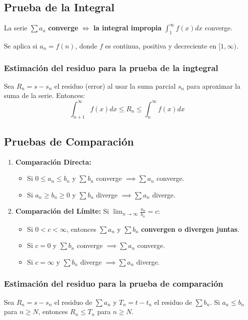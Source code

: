 \documentclass[a4paper,12pt]{article}
\begin{document}
\subsection{Prueba de la Integral}
\begin{tcolorbox}
    La serie $\sum a_n$ \textbf{ converge } $\Leftrightarrow$ \textbf{ la integral impropia } $\int_{1}^{\infty} f(x) dx$ converge.
\end{tcolorbox}
Se aplica si $a_n = f(n)$, donde $f$ es continua, positiva y decreciente en $[1, \infty)$.

\subsubsection{Estimación del residuo para la prueba de la ingtegral}
Sea $R_n = s - s_n$ el residuo (error) al usar la suma parcial $s_n$ para aproximar la suma de la serie. Entonces:
$$ \int_{n+1}^{\infty} f(x) dx \leqslant R_n \leqslant \int_{n}^{\infty} f(x) dx $$

\subsection{Pruebas de Comparación}
\begin{enumerate}
    \item \textbf{Comparación Directa:} 
        \begin{itemize}
            \item Si $0 \leqslant a_n \leqslant b_n$ y $\sum b_n$ converge $\implies \sum a_n$ converge.
            \item Si $a_n \geqslant b_n \geqslant 0$ y $\sum b_n$ diverge $\implies \sum a_n$ diverge.
        \end{itemize}
    \item \textbf{Comparación del Límite:} Si $\lim_{n \to \infty} \frac{a_n}{b_n} = c$:
        \begin{itemize}
            \item Si $0 < c < \infty$, entonces $\sum a_n$ y $\sum b_n$ \textbf{convergen o divergen juntas}.
            \item Si $c = 0$ y $\sum b_n$ converge $\implies \sum a_n$ converge.
            \item Si $c = \infty$ y $\sum b_n$ diverge $\implies \sum a_n$ diverge.
        \end{itemize}
\end{enumerate}

\subsubsection{Estimación del residuo para la prueba de comparación}
Sea $R_n = s - s_n$ el residuo de $\sum a_n$ y $T_n = t - t_n$ el residuo de $\sum b_n$. Si $a_n \leqslant b_n$ para $n \geqslant N$, entonces $R_n \leqslant T_n$ para $n \geqslant N$.
\end{document}
